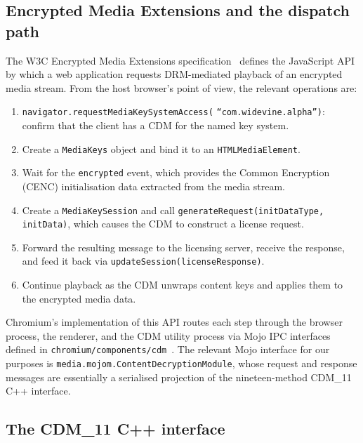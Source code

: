 \documentclass[11pt,letterpaper]{article}
\begin{document}
\subsection{Encrypted Media Extensions and the dispatch path}
\label{sec:bg-eme}

The W3C Encrypted Media Extensions specification~\cite{w3c-eme}
defines the JavaScript API by which a web application requests
DRM-mediated playback of an encrypted media stream. From the host
browser's point of view, the relevant operations are:

\begin{enumerate}[itemsep=2pt,topsep=2pt]
  \item \texttt{navigator.requestMediaKeySystemAccess(}
        \texttt{``com.widevine.alpha''}\texttt{)}: confirm that the
        client has a CDM for the named key system.
  \item Create a \texttt{MediaKeys} object and bind it to an
        \texttt{HTMLMediaElement}.
  \item Wait for the \texttt{encrypted} event, which provides the
        Common Encryption (CENC) initialisation data extracted from
        the media stream.
  \item Create a \texttt{MediaKeySession} and call
        \texttt{generateRequest(initDataType, initData)}, which
        causes the CDM to construct a license request.
  \item Forward the resulting message to the licensing server,
        receive the response, and feed it back via
        \texttt{updateSession(licenseResponse)}.
  \item Continue playback as the CDM unwraps content keys and
        applies them to the encrypted media data.
\end{enumerate}

Chromium's implementation of this API routes each step through the
browser process, the renderer, and the CDM utility process via Mojo
IPC interfaces defined in
\texttt{chromium/components/cdm}~\cite{chromium-cdm-mojo}. The
relevant Mojo interface for our purposes is
\texttt{media.mojom.ContentDecryptionModule}, whose request and
response messages are essentially a serialised projection of the
nineteen-method CDM\_11 C++ interface.

\subsection{The CDM\_11 C++ interface}
\label{sec:bg-cdm11}
\end{document}
